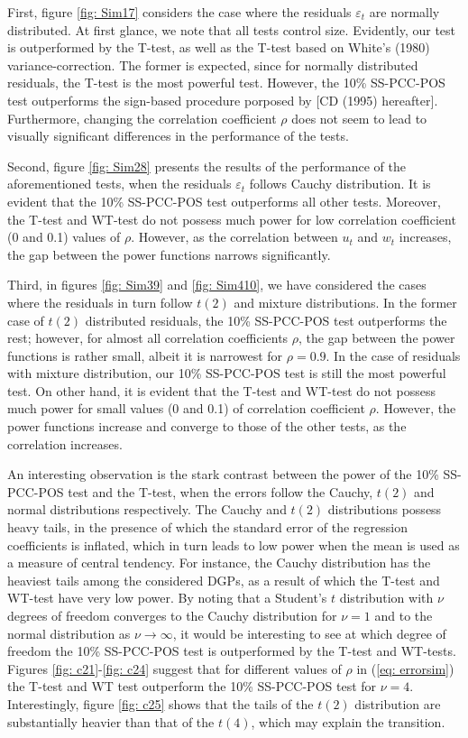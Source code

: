 \documentclass[harvard,11pt]{article}
\begin{document}
First, figure \ref{fig: Sim17} considers the case where the residuals $\varepsilon_t$ are normally distributed. At first glance, we note that all tests control size. Evidently, our test is outperformed by the T-test, as well as the T-test based on White's (1980) variance-correction. The former is expected, since for normally distributed residuals, the T-test is the most powerful test. However, the 10\% SS-PCC-POS test outperforms the sign-based procedure porposed by \citet{dufour1995exact} [CD (1995) hereafter]. Furthermore, changing the correlation coefficient $\rho$ does not seem to lead to visually significant differences in the performance of the tests.
 
Second, figure \ref{fig: Sim28} presents the results of the performance of the aforementioned tests, when the residuals $\varepsilon_t$ follows Cauchy distribution. It is evident that the 10\% SS-PCC-POS test outperforms all other tests. Moreover, the T-test and WT-test do not possess much power for low correlation coefficient (0 and 0.1) values of $\rho$. However, as the correlation between $u_t$ and $w_t$ increases, the gap between the power functions narrows significantly.  

Third, in figures \ref{fig: Sim39} and \ref{fig: Sim410}, we have considered the cases where the residuals in turn follow $t(2)$ and mixture distributions. In the former case of $t(2)$ distributed residuals, the 10\% SS-PCC-POS test outperforms the rest; however, for almost all correlation coefficients $\rho$, the gap between the power functions is rather small, albeit it is narrowest for $\rho=0.9$. In the case of residuals with mixture distribution, our 10\% SS-PCC-POS test is still the most powerful test. On other hand, it is evident that the T-test and WT-test do not possess much power for small values (0 and 0.1) of correlation coefficient $\rho$. However, the power functions increase and converge to those of the other tests, as the correlation increases.

An interesting observation is the stark contrast between the power of the 10\% SS-PCC-POS test and the T-test, when the errors follow the Cauchy, $t(2)$ and normal distributions respectively. The Cauchy and $t(2)$ distributions possess heavy tails, in the presence of which the standard error of the regression coefficients is inflated, which in turn leads to low power when the mean is used as a measure of central tendency. For instance, the Cauchy distribution has the heaviest tails among the considered  DGPs, as a result of which the T-test and WT-test have very low power. By noting that a Student's $t$ distribution with $\nu$ degrees of freedom converges to the Cauchy distribution for $\nu=1$ and to the normal distribution as $\nu\rightarrow \infty$, it would be interesting to see at which degree of freedom the 10\% SS-PCC-POS test is outperformed by the T-test and WT-tests.  Figures \ref{fig: c21}-\ref{fig: c24} suggest that for different values of $\rho$ in (\ref{eq: errorsim}) the T-test and WT test outperform the 10\% SS-PCC-POS test for $\nu=4$. Interestingly, figure \ref{fig: c25} shows that the tails of the $t(2)$ distribution are substantially heavier than that of the $t(4)$, which may explain the transition.
\end{document}
